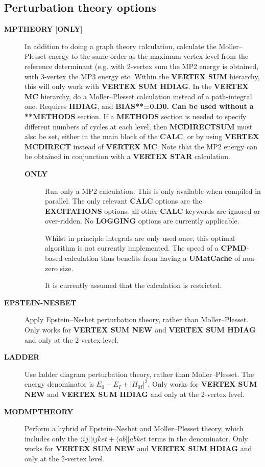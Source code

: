 \documentclass[openany,a4paper,10pt]{manual}
\newcommand{\bra}{\ensuremath{\langle}}
\begin{document}
\subsection{Perturbation theory options}
\begin{description}
\item[\textbf{MPTHEORY} {[}\textbf{ONLY}{]}]
In addition to doing a graph theory calculation, calculate the Moller--Plesset
energy to the same order as the maximum vertex level from the
reference determinant (e.g. with 2-vertex sum the MP2 energy is
obtained, with 3-vertex the MP3 energy etc.  Within the \textbf{VERTEX SUM}
hierarchy, this will only work with \textbf{VERTEX SUM HDIAG}.
In the \textbf{VERTEX MC} hierarchy, do a Moller--Plesset calculation
instead of a path-integral one.  Requires \textbf{HDIAG}, and \textbf{BIAS**=0.D0.
Can be used without a **METHODS} section.  If a \textbf{METHODS} section is
needed to specify different numbers of cycles at each level, then
\textbf{MCDIRECTSUM} must also be set, either in the main block of the \textbf{CALC},
or by using \textbf{VERTEX MCDIRECT} instead of \textbf{VERTEX MC}.
Note that the MP2 energy
can be obtained in conjunction with a \textbf{VERTEX STAR} calculation.
\begin{description}
\item[\textbf{ONLY}]
Run only a MP2 calculation.  This is only available when
compiled in parallel.  The only relevant \textbf{CALC} options are the
\textbf{EXCITATIONS} options: all other \textbf{CALC} keywords are ignored
or over-ridden.  No \textbf{LOGGING} options are currently applicable.

Whilst in principle integrals are only used once, this optimal
algorithm is not currently implemented.  The speed of a \textbf{CPMD}-based
calculation thus benefits from having a \textbf{UMatCache} of non-zero size.

\begin{notice}[warning]
It is currently assumed that the calculation is restricted.
\end{notice}

\end{description}

\item[\textbf{EPSTEIN-NESBET}]
Apply Epstein--Nesbet perturbation theory, rather than
Moller--Plesset.  Only works for \textbf{VERTEX SUM NEW} and \textbf{VERTEX
SUM HDIAG} and only at the 2-vertex level.

\item[\textbf{LADDER}]
Use ladder diagram perturbation theory, rather than Moller--Plesset.
The energy denominator is $E_0-E_I+|H_{0I}|^2$.  Only works
for \textbf{VERTEX SUM NEW} and \textbf{VERTEX SUM HDIAG} and only at the
2-vertex level.

\item[\textbf{MODMPTHEORY}]
Perform a hybrid of Epstein--Nesbet and Moller--Plesset theory,
which includes only the $\bra ij||ij ket +\bra ab||ab ket$
terms in the denominator.  Only works for \textbf{VERTEX SUM NEW} and
\textbf{VERTEX SUM HDIAG} and only at the 2-vertex level.

\end{description}
\end{document}
